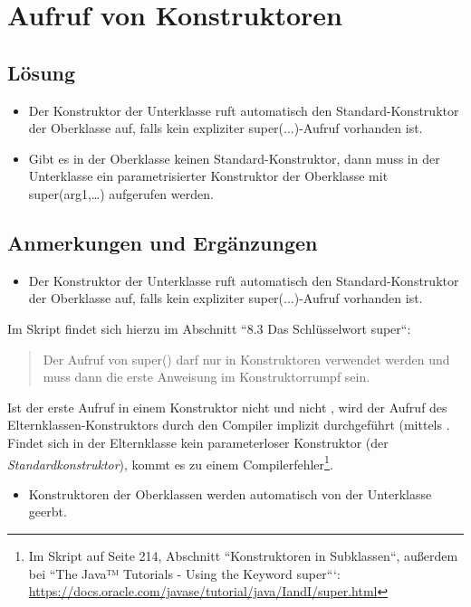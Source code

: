 \chapter{Aufruf von Konstruktoren}

\section*{Lösung}

\begin{itemize}
    \item Der Konstruktor der Unterklasse ruft automatisch den Standard-Konstruktor der Oberklasse auf, falls kein expliziter super(...)-Aufruf vorhanden ist.
    \item Gibt es in der Oberklasse keinen Standard-Konstruktor, dann muss in der Unterklasse ein parametrisierter Konstruktor der Oberklasse mit super(arg1,…) aufgerufen werden.
\end{itemize}


\section*{Anmerkungen und Ergänzungen}

\begin{itemize}
    \item Der Konstruktor der Unterklasse ruft automatisch den Standard-Konstruktor der Oberklasse auf, falls kein expliziter super(...)-Aufruf vorhanden ist.
\end{itemize}

Im Skript findet sich hierzu im Abschnitt ``8.3 Das Schlüsselwort super``:\blockquote{
Der Aufruf von super() darf nur in Konstruktoren verwendet werden und muss dann die erste Anweisung im Konstruktorrumpf sein.
}

Ist der erste Aufruf in einem Konstruktor nicht  und nicht , wird der Aufruf des Elternklassen-Konstruktors
 durch den Compiler implizit durchgeführt (mittels . Findet sich in der Elternklasse kein parameterloser Konstruktor (der \textit{Standardkonstruktor}), kommt es zu einem Compilerfehler\footnote{Im Skript auf Seite 214, Abschnitt ``Konstruktoren in Subklassen``, außerdem bei ``The Java™ Tutorials - Using the Keyword super```: \url{https://docs.oracle.com/javase/tutorial/java/IandI/super.html}}.


\begin{itemize}
\item Konstruktoren der Oberklassen werden automatisch von der Unterklasse geerbt.
\end{itemize}

